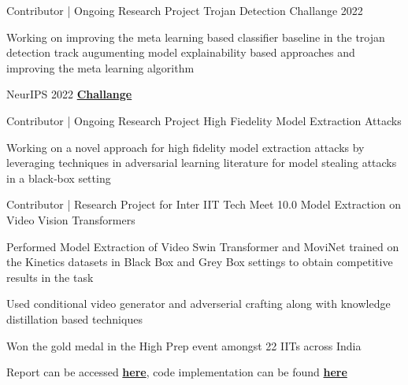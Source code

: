 
\begin{cventries}


\cventry
{Contributor | Ongoing Research Project} %
{Trojan Detection Challange 2022} %
{} %
{} %
{
	\begin{cvitems} %
		\item {Working on improving the meta learning based classifier baseline in the trojan detection track augumenting model explainability based approaches and improving the meta learning algorithm}
		\item {NeurIPS 2022 \href{https://trojandetection.ai/}{\bf Challange}}
	\end{cvitems}
}

\cventry
{Contributor | Ongoing Research Project} %
{High Fiedelity Model Extraction Attacks} %
{} %
{} %
{
	\begin{cvitems} %
		\item {Working on a novel approach for high fidelity model extraction attacks by leveraging techniques in adversarial learning literature for model stealing attacks in a black‑box setting}
	\end{cvitems}
}

\cventry
{Contributor | Research Project for Inter IIT Tech Meet 10.0} %
{Model Extraction on Video Vision Transformers} %
{} %
{} %
{
	\begin{cvitems} %
		\item {Performed Model Extraction of Video Swin Transformer and MoviNet trained on the Kinetics datasets in Black Box and Grey Box settings to obtain competitive results in the task}
		\item {Used conditional video generator and adverserial crafting along with knowledge distillation based techniques}
		\item {Won the gold medal in the High Prep event amongst 22 IITs across India}
		\item {Report can be accessed {\href{https://github.com/dsgiitr/BOSCH-MODEL-EXTRACTION-ATTACK-FOR-VIDEO-CLASSIFICATION/blob/master/Documentation/report_final.pdf}{\bf here}}, code implementation can be found {\href{https://github.com/dsgiitr/BOSCH-MODEL-EXTRACTION-ATTACK-FOR-VIDEO-CLASSIFICATION}{\bf here}}} 
	\end{cvitems}
}


\end{cventries}
